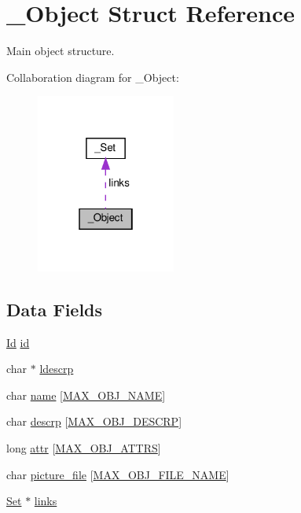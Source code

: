 \hypertarget{struct__Object}{}\section{\+\_\+\+Object Struct Reference}
\label{struct__Object}


Main object structure.  




Collaboration diagram for \+\_\+\+Object\+:\nopagebreak
\begin{figure}[H]
\begin{center}
\leavevmode
\includegraphics[width=130pt]{struct__Object__coll__graph}
\end{center}
\end{figure}
\subsection*{Data Fields}
\begin{DoxyCompactItemize}
\item 
\hyperlink{types_8h_a845e604fb28f7e3d97549da3448149d3}{Id} \hyperlink{struct__Object_a3cff7a0e8dc4e9d23895ed9af1b7653a}{id}
\item 
char $\ast$ \hyperlink{struct__Object_ab2d033c018fbe2639c88561e55306832}{ldescrp}
\item 
char \hyperlink{struct__Object_a59556463a256cec309077768589f10a8}{name} \mbox{[}\hyperlink{object_8h_a6a2f391825e94d06a3137b75abfa1bba}{M\+A\+X\+\_\+\+O\+B\+J\+\_\+\+N\+A\+ME}\mbox{]}
\item 
char \hyperlink{struct__Object_affa493ad8fdeafe924950f7388356a55}{descrp} \mbox{[}\hyperlink{object_8h_a9c396da2f3b9f0191120ff1666af6381}{M\+A\+X\+\_\+\+O\+B\+J\+\_\+\+D\+E\+S\+C\+RP}\mbox{]}
\item 
long \hyperlink{struct__Object_a9074217e572100d1259487a818bb0a0a}{attr} \mbox{[}\hyperlink{object_8h_a6b252b064231d7dc71c194dfea24b32b}{M\+A\+X\+\_\+\+O\+B\+J\+\_\+\+A\+T\+T\+RS}\mbox{]}
\item 
char \hyperlink{struct__Object_af8990f408c6f3706835f7163b425e47b}{picture\+\_\+file} \mbox{[}\hyperlink{object_8h_aa9e64066438f277a4c1e56c3037c4f2d}{M\+A\+X\+\_\+\+O\+B\+J\+\_\+\+F\+I\+L\+E\+\_\+\+N\+A\+ME}\mbox{]}
\item 
\hyperlink{set_8h_a6d3b7f7c92cbb4577ef3ef7ddbf93161}{Set} $\ast$ \hyperlink{struct__Object_afd29bc78dd0fc104db1aab87c6fc7d5c}{links}
\end{DoxyCompactItemize}


